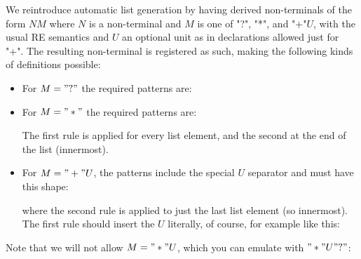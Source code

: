 \documentclass[11pt]{article} %
\begin{document}
We reintroduce automatic list generation by having derived non-terminals of the form $NM$
where $N$ is a non-terminal and $M$ is one of "?", "*", and "+"$U$, with the usual RE semantics
and $U$ an optional unit as in  declarations allowed just for "+". The resulting
non-terminal is registered as such, making the following kinds of definitions possible:
\begin{itemize}

\item For $M="?"$ the required patterns are:

\item For $M="*"$ the required patterns are:
  The first rule is applied for every list element, and the second at the end of the list
  (innermost).

\item For $M="+"U$, the patterns include the special $U$ separator and must have this shape:
  where the second rule is applied to just the last list element (so innermost). The first rule
  should insert the $U$ literally, of course, for example like this:

\end{itemize}
Note that we will not allow $M="*"U$, which you can emulate with $"*"U"?"$:
\end{document}
